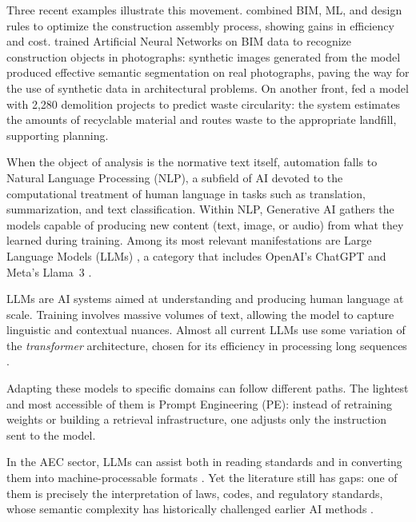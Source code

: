 \documentclass[a4paper,fleqn]{cas-sc}
\begin{document}
Three recent examples illustrate this movement. \citet{liu2022} combined BIM, ML, and design rules to optimize the construction assembly process, showing gains in efficiency and cost. \citet{alawadhi2023} trained Artificial Neural Networks on BIM data to recognize construction objects in photographs: synthetic images generated from the model produced effective semantic segmentation on real photographs, paving the way for the use of synthetic data in architectural problems. On another front, \citet{saka2024} fed a model with 2,280 demolition projects to predict waste circularity: the system estimates the amounts of recyclable material and routes waste to the appropriate landfill, supporting planning.

When the object of analysis is the normative text itself, automation falls to Natural Language Processing (NLP), a subfield of AI devoted to the computational treatment of human language in tasks such as translation, summarization, and text classification. Within NLP, Generative AI gathers the models capable of producing new content (text, image, or audio) from what they learned during training. Among its most relevant manifestations are Large Language Models (LLMs) \citep{zhao2023}, a category that includes OpenAI's ChatGPT \citep{openai2024} and Meta's Llama~3 \citep{llama3}.

LLMs are AI systems aimed at understanding and producing human language at scale. Training involves massive volumes of text, allowing the model to capture linguistic and contextual nuances. Almost all current LLMs use some variation of the \textit{transformer} architecture, chosen for its efficiency in processing long sequences \citep{zhao2023}.

Adapting these models to specific domains can follow different paths. The lightest and most accessible of them is Prompt Engineering (PE): instead of retraining weights or building a retrieval infrastructure, one adjusts only the instruction sent to the model.

In the AEC sector, LLMs can assist both in reading standards and in converting them into machine-processable formats \citep{fuchs2024}. Yet the literature still has gaps: one of them is precisely the interpretation of laws, codes, and regulatory standards, whose semantic complexity has historically challenged earlier AI methods \citep{fuchs2024}.
\end{document}
